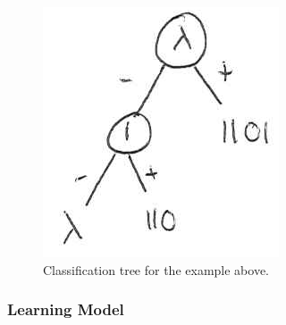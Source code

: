 \documentclass[12pt, letterpaper]{article}
\numberwithin{equation}{section} %
\theoremstyle{definition}
\theoremstyle{remark}
\begin{document}
\begin{figure}[H]
\centering
\includegraphics[width=0.3\linewidth]{../img/dfa-to-tree.png}
\caption{Classification tree for the example above.}
\end{figure}

\subsubsection*{Learning Model}
\end{document}
